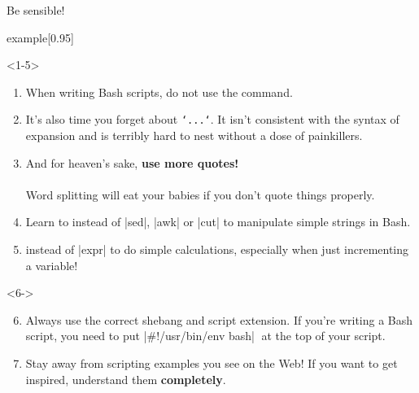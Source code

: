 \begin{frame}{Be sensible!}
    \vspace{-2mm}
    \begin{varblock}{example}[0.95\textwidth]{}
        \large {}
    \end{varblock}
    \medskip
    \parbox[c][0.7\textheight][t]{\textwidth}{
        \begin{onlyenv}<1-5>
            \begin{enumerate}[<+->]
                \item When writing Bash scripts, \alert{do not use the \bash{[} command.}\\
                       \bash{[[}
                \item It's also time \alert{you forget about \texttt{`...`}}.
                      It isn't consistent with the syntax of expansion and is terribly hard to nest without a dose of painkillers.
                \item And for heaven's sake, \textbf{use more quotes!}\\
                      \\
                      Word splitting will eat your babies if you don't quote things properly.
                \item Learn to  instead of \bash|sed|, \bash|awk| or \bash|cut| to manipulate simple strings in Bash.
                \item {} instead of \bash|expr| to do simple calculations, especially when just incrementing a variable!
            \end{enumerate}
        \end{onlyenv}
        \begin{onlyenv}<6->
            \begin{enumerate}[<+->]
                \setcounter{enumi}{5}
                \item Always use the correct shebang and script extension.
                      If you're writing a Bash script, you need to put \bash|\#!/usr/bin/env bash|$\;$ at the top of your script.
                \item Stay away from scripting examples you see on the Web!
                      If you want to get inspired, understand them \textbf{completely}.

\end{enumerate}
\end{onlyenv}}
\end{frame}
